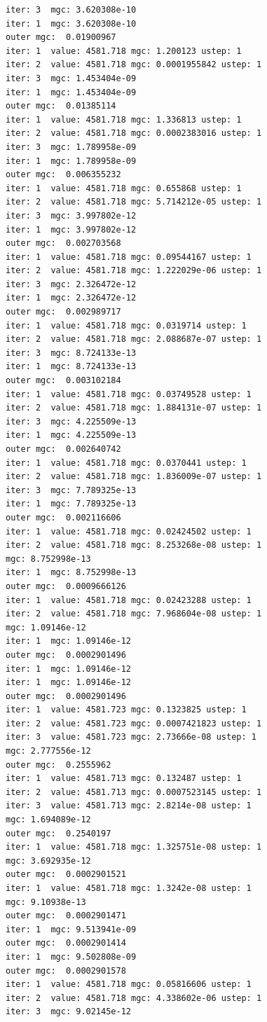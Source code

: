 \documentclass[
  letterpaper,
  DIV=11,
  numbers=noendperiod]{scrartcl}
\begin{document}
\begin{verbatim}
iter: 3  mgc: 3.620308e-10 
iter: 1  mgc: 3.620308e-10 
outer mgc:  0.01900967 
iter: 1  value: 4581.718 mgc: 1.200123 ustep: 1 
iter: 2  value: 4581.718 mgc: 0.0001955842 ustep: 1 
iter: 3  mgc: 1.453404e-09 
iter: 1  mgc: 1.453404e-09 
outer mgc:  0.01385114 
iter: 1  value: 4581.718 mgc: 1.336813 ustep: 1 
iter: 2  value: 4581.718 mgc: 0.0002383016 ustep: 1 
iter: 3  mgc: 1.789958e-09 
iter: 1  mgc: 1.789958e-09 
outer mgc:  0.006355232 
iter: 1  value: 4581.718 mgc: 0.655868 ustep: 1 
iter: 2  value: 4581.718 mgc: 5.714212e-05 ustep: 1 
iter: 3  mgc: 3.997802e-12 
iter: 1  mgc: 3.997802e-12 
outer mgc:  0.002703568 
iter: 1  value: 4581.718 mgc: 0.09544167 ustep: 1 
iter: 2  value: 4581.718 mgc: 1.222029e-06 ustep: 1 
iter: 3  mgc: 2.326472e-12 
iter: 1  mgc: 2.326472e-12 
outer mgc:  0.002989717 
iter: 1  value: 4581.718 mgc: 0.0319714 ustep: 1 
iter: 2  value: 4581.718 mgc: 2.088687e-07 ustep: 1 
iter: 3  mgc: 8.724133e-13 
iter: 1  mgc: 8.724133e-13 
outer mgc:  0.003102184 
iter: 1  value: 4581.718 mgc: 0.03749528 ustep: 1 
iter: 2  value: 4581.718 mgc: 1.884131e-07 ustep: 1 
iter: 3  mgc: 4.225509e-13 
iter: 1  mgc: 4.225509e-13 
outer mgc:  0.002640742 
iter: 1  value: 4581.718 mgc: 0.0370441 ustep: 1 
iter: 2  value: 4581.718 mgc: 1.836009e-07 ustep: 1 
iter: 3  mgc: 7.789325e-13 
iter: 1  mgc: 7.789325e-13 
outer mgc:  0.002116606 
iter: 1  value: 4581.718 mgc: 0.02424502 ustep: 1 
iter: 2  value: 4581.718 mgc: 8.253268e-08 ustep: 1 
mgc: 8.752998e-13 
iter: 1  mgc: 8.752998e-13 
outer mgc:  0.0009666126 
iter: 1  value: 4581.718 mgc: 0.02423288 ustep: 1 
iter: 2  value: 4581.718 mgc: 7.968604e-08 ustep: 1 
mgc: 1.09146e-12 
iter: 1  mgc: 1.09146e-12 
outer mgc:  0.0002901496 
iter: 1  mgc: 1.09146e-12 
iter: 1  mgc: 1.09146e-12 
outer mgc:  0.0002901496 
iter: 1  value: 4581.723 mgc: 0.1323825 ustep: 1 
iter: 2  value: 4581.723 mgc: 0.0007421823 ustep: 1 
iter: 3  value: 4581.723 mgc: 2.73666e-08 ustep: 1 
mgc: 2.777556e-12 
outer mgc:  0.2555962 
iter: 1  value: 4581.713 mgc: 0.132487 ustep: 1 
iter: 2  value: 4581.713 mgc: 0.0007523145 ustep: 1 
iter: 3  value: 4581.713 mgc: 2.8214e-08 ustep: 1 
mgc: 1.694089e-12 
outer mgc:  0.2540197 
iter: 1  value: 4581.718 mgc: 1.325751e-08 ustep: 1 
mgc: 3.692935e-12 
outer mgc:  0.0002901521 
iter: 1  value: 4581.718 mgc: 1.3242e-08 ustep: 1 
mgc: 9.10938e-13 
outer mgc:  0.0002901471 
iter: 1  mgc: 9.513941e-09 
outer mgc:  0.0002901414 
iter: 1  mgc: 9.502808e-09 
outer mgc:  0.0002901578 
iter: 1  value: 4581.718 mgc: 0.05816606 ustep: 1 
iter: 2  value: 4581.718 mgc: 4.338602e-06 ustep: 1 
iter: 3  mgc: 9.02145e-12 

\end{verbatim}
\end{document}
